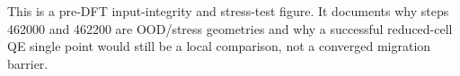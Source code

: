 This is a pre-DFT input-integrity and stress-test figure. It documents why steps 462000 and 462200 are OOD/stress geometries and why a successful reduced-cell QE single point would still be a local comparison, not a converged migration barrier.
